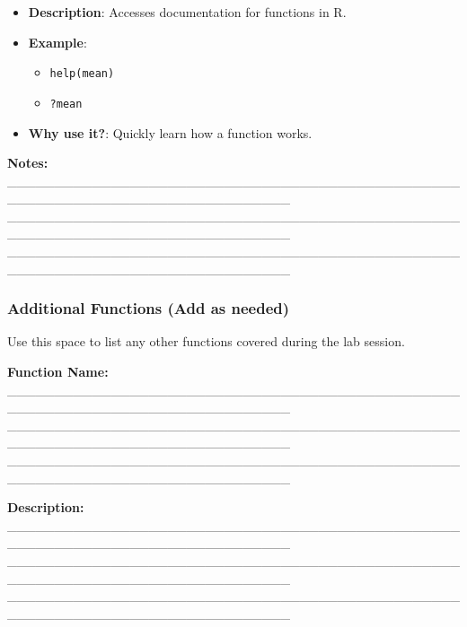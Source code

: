 \documentclass[
  11pt,
]{article}
\providecommand{\tightlist}{%
  \setlength{\itemsep}{0pt}\setlength{\parskip}{0pt}}
\begin{document}
\begin{itemize}
\tightlist
\item
  \textbf{Description}: Accesses documentation for functions in R.
\item
  \textbf{Example}:

  \begin{itemize}
  \tightlist
  \item
    \texttt{help(mean)}
  \item
    \texttt{?mean}
  \end{itemize}
\item
  \textbf{Why use it?}: Quickly learn how a function works.
\end{itemize}

\textbf{Notes:}
\_\_\_\_\_\_\_\_\_\_\_\_\_\_\_\_\_\_\_\_\_\_\_\_\_\_\_\_\_\_\_\_\_\_\_\_\_\_\_\_\_\_\_\_\_\_\_\_\_\_\_\_\_\_\_\_\_\_\_\_\_\_\_\_\_\_\_\_\_\_\_\_\_\_\_\_\_\_
\_\_\_\_\_\_\_\_\_\_\_\_\_\_\_\_\_\_\_\_\_\_\_\_\_\_\_\_\_\_\_\_\_\_\_\_\_\_\_\_\_\_\_\_\_\_\_\_\_\_\_\_\_\_\_\_\_\_\_\_\_\_\_\_\_\_\_\_\_\_\_\_\_\_\_\_\_\_
\_\_\_\_\_\_\_\_\_\_\_\_\_\_\_\_\_\_\_\_\_\_\_\_\_\_\_\_\_\_\_\_\_\_\_\_\_\_\_\_\_\_\_\_\_\_\_\_\_\_\_\_\_\_\_\_\_\_\_\_\_\_\_\_\_\_\_\_\_\_\_\_\_\_\_\_\_\_

\subsubsection{Additional Functions (Add as
needed)}\label{additional-functions-add-as-needed}

Use this space to list any other functions covered during the lab
session.

\textbf{Function Name:}
\_\_\_\_\_\_\_\_\_\_\_\_\_\_\_\_\_\_\_\_\_\_\_\_\_\_\_\_\_\_\_\_\_\_\_\_\_\_\_\_\_\_\_\_\_\_\_\_\_\_\_\_\_\_\_\_\_\_\_\_\_\_\_\_\_\_\_\_\_\_\_\_\_\_\_\_\_\_
\_\_\_\_\_\_\_\_\_\_\_\_\_\_\_\_\_\_\_\_\_\_\_\_\_\_\_\_\_\_\_\_\_\_\_\_\_\_\_\_\_\_\_\_\_\_\_\_\_\_\_\_\_\_\_\_\_\_\_\_\_\_\_\_\_\_\_\_\_\_\_\_\_\_\_\_\_\_
\_\_\_\_\_\_\_\_\_\_\_\_\_\_\_\_\_\_\_\_\_\_\_\_\_\_\_\_\_\_\_\_\_\_\_\_\_\_\_\_\_\_\_\_\_\_\_\_\_\_\_\_\_\_\_\_\_\_\_\_\_\_\_\_\_\_\_\_\_\_\_\_\_\_\_\_\_\_

\textbf{Description:}
\_\_\_\_\_\_\_\_\_\_\_\_\_\_\_\_\_\_\_\_\_\_\_\_\_\_\_\_\_\_\_\_\_\_\_\_\_\_\_\_\_\_\_\_\_\_\_\_\_\_\_\_\_\_\_\_\_\_\_\_\_\_\_\_\_\_\_\_\_\_\_\_\_\_\_\_\_\_
\_\_\_\_\_\_\_\_\_\_\_\_\_\_\_\_\_\_\_\_\_\_\_\_\_\_\_\_\_\_\_\_\_\_\_\_\_\_\_\_\_\_\_\_\_\_\_\_\_\_\_\_\_\_\_\_\_\_\_\_\_\_\_\_\_\_\_\_\_\_\_\_\_\_\_\_\_\_
\_\_\_\_\_\_\_\_\_\_\_\_\_\_\_\_\_\_\_\_\_\_\_\_\_\_\_\_\_\_\_\_\_\_\_\_\_\_\_\_\_\_\_\_\_\_\_\_\_\_\_\_\_\_\_\_\_\_\_\_\_\_\_\_\_\_\_\_\_\_\_\_\_\_\_\_\_\_
\end{document}
